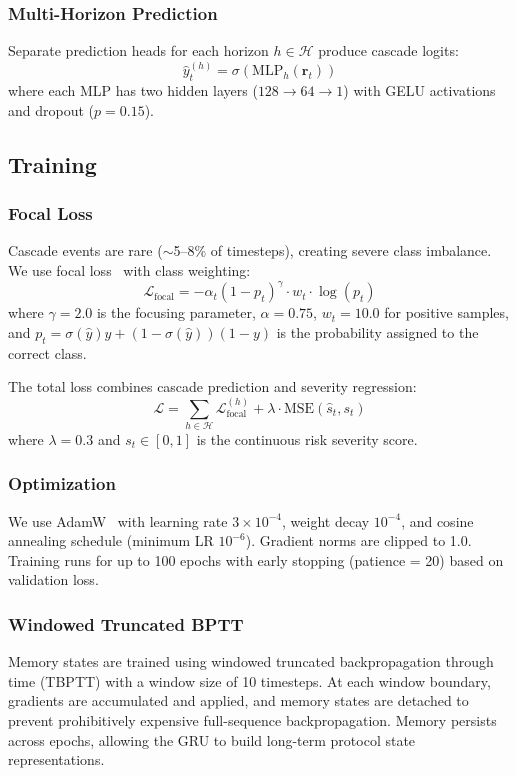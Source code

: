 \documentclass[journal]{IEEEtran}
\begin{document}
\subsubsection{Multi-Horizon Prediction}
Separate prediction heads for each horizon $h \in \mathcal{H}$ produce cascade logits:
\begin{equation}
    \hat{y}_t^{(h)} = \sigma\left(\text{MLP}_h(\mathbf{r}_t)\right)
\end{equation}
where each MLP has two hidden layers ($128 \rightarrow 64 \rightarrow 1$) with GELU activations and dropout ($p = 0.15$).

\subsection{Training}

\subsubsection{Focal Loss}
Cascade events are rare ($\sim$5--8\% of timesteps), creating severe class imbalance. We use focal loss~\cite{lin2017focal} with class weighting:
\begin{equation}
    \mathcal{L}_{\text{focal}} = -\alpha_t (1 - p_t)^\gamma \cdot w_t \cdot \log(p_t)
\end{equation}
where $\gamma = 2.0$ is the focusing parameter, $\alpha = 0.75$, $w_t = 10.0$ for positive samples, and $p_t = \sigma(\hat{y})y + (1 - \sigma(\hat{y}))(1-y)$ is the probability assigned to the correct class.

The total loss combines cascade prediction and severity regression:
\begin{equation}
    \mathcal{L} = \sum_{h \in \mathcal{H}} \mathcal{L}_{\text{focal}}^{(h)} + \lambda \cdot \text{MSE}(\hat{s}_t, s_t)
\end{equation}
where $\lambda = 0.3$ and $s_t \in [0, 1]$ is the continuous risk severity score.

\subsubsection{Optimization}
We use AdamW~\cite{loshchilov2019adamw} with learning rate $3 \times 10^{-4}$, weight decay $10^{-4}$, and cosine annealing schedule (minimum LR $10^{-6}$). Gradient norms are clipped to 1.0. Training runs for up to 100 epochs with early stopping (patience = 20) based on validation loss.

\subsubsection{Windowed Truncated BPTT}
Memory states are trained using windowed truncated backpropagation through time (TBPTT) with a window size of 10 timesteps. At each window boundary, gradients are accumulated and applied, and memory states are detached to prevent prohibitively expensive full-sequence backpropagation. Memory persists across epochs, allowing the GRU to build long-term protocol state representations.
\end{document}
